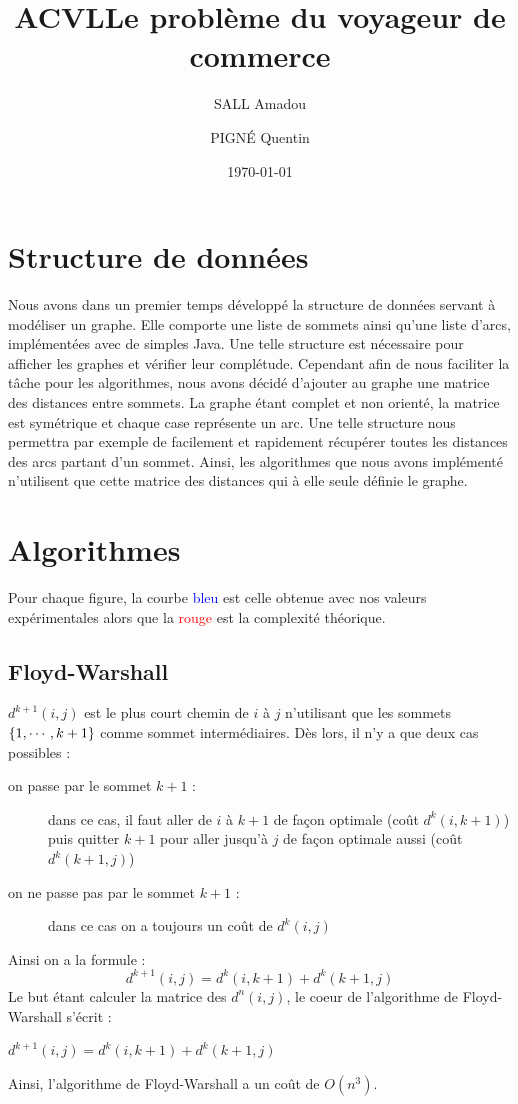 \documentclass[11pt]{article} \usepackage[top=2cm, bottom=2cm, left=2cm, right=2cm]{geometry}
\title{ACVL} \title{Le problème du voyageur de commerce} \author{SALL Amadou \and PIGN\'E Quentin } \date{\today}
\begin{document}
\maketitle
\section{Structure de données}
Nous avons dans un premier temps développé la structure de données servant à modéliser un graphe. Elle comporte une liste de sommets ainsi qu'une liste d'arcs, implémentées avec de simples  Java. Une telle structure est nécessaire pour afficher les graphes et vérifier leur complétude. Cependant afin de nous faciliter la tâche pour les algorithmes, nous avons décidé d'ajouter au graphe une matrice des distances entre sommets. La graphe étant complet et non orienté, la matrice est symétrique et chaque case représente un arc. Une telle structure nous permettra par exemple de facilement et rapidement récupérer toutes les distances des arcs partant d'un sommet. Ainsi, les algorithmes que nous avons implémenté n'utilisent que cette matrice des
distances qui à elle seule définie le graphe.
\section{Algorithmes}
Pour chaque figure, la courbe \textcolor{blue}{bleu} est celle obtenue avec nos valeurs expérimentales alors que la \textcolor{red}{rouge} est la complexité théorique.
\subsection*{Floyd-Warshall}
$d^{k+1}(i,j)$ est le plus court chemin de $i$ à $j$ n'utilisant que les sommets $\left\{1,\cdots,k+1\right\}$ comme sommet intermédiaires. Dès lors, il n'y a que deux cas possibles :
\begin{description}
    \item[on passe par le sommet $k+1$ :]  dans ce cas, il faut aller de $i$ à $k+1$ de façon optimale (coût $d^{k}(i,k+1)$) puis quitter $k+1$ pour aller jusqu'à $j$ de façon optimale aussi (coût $d^{k}(k+1,j)$)
\item[on ne passe pas par le sommet $k+1$ :] dans ce cas on a toujours un coût de $d^{k}(i,j)$
\end{description}
Ainsi on a la formule :
\begin{displaymath}
  d^{k+1}(i,j) = d^{k}(i,k+1) + d^{k}(k+1,j) 
\end{displaymath}
Le but étant calculer la matrice des $d^{n}(i,j)$, le coeur de l'algorithme de Floyd-Warshall s'écrit :
  \begin{algorithmic}[]
           \State $ d^{k+1}(i,j) = d^{k}(i,k+1) + d^{k}(k+1,j) $
           \EndFor
       \EndFor
   \EndFor
  \end{algorithmic}
Ainsi, l'algorithme de Floyd-Warshall a un coût de $O(n^3)$.
\end{document}
